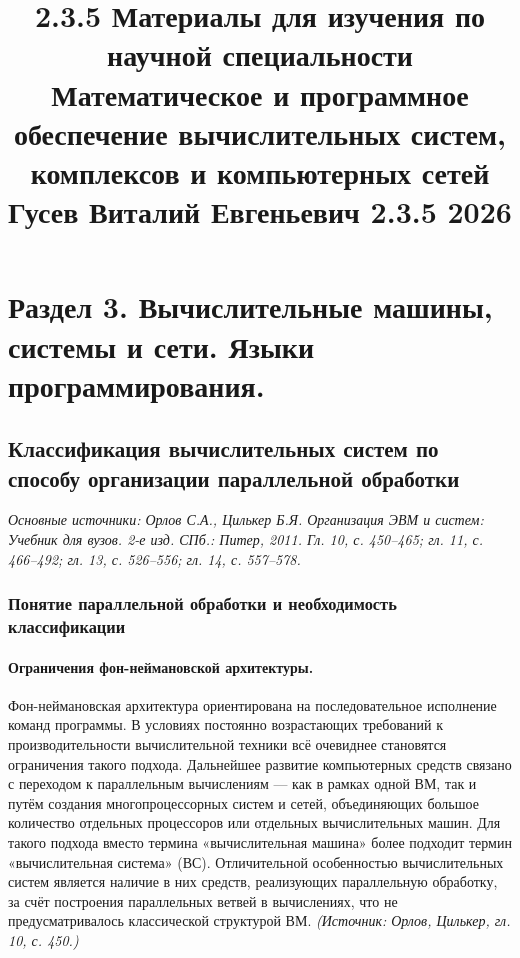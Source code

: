 \documentclass[a4paper,12pt]{article}
\title{2.3.5 Материалы для изучения по научной специальности \\
Математическое и программное обеспечение вычислительных систем, комплексов и компьютерных сетей \\
Гусев Виталий Евгеньевич 2.3.5 2026}
\date{}
\begin{document}
\maketitle

\tableofcontents
\newpage

\setcounter{section}{1} %
\section{Раздел 3. Вычислительные машины, системы и сети. Языки программирования.}

\subsection{Классификация вычислительных систем по способу организации параллельной обработки}

\noindent\textit{Основные источники: Орлов С.А., Цилькер Б.Я. Организация ЭВМ и систем: Учебник для вузов. 2-е изд. СПб.: Питер, 2011. Гл. 10, с. 450--465; гл. 11, с. 466--492; гл. 13, с. 526--556; гл. 14, с. 557--578.}

\subsubsection{Понятие параллельной обработки и необходимость классификации}

\paragraph{Ограничения фон-неймановской архитектуры.}
Фон-неймановская архитектура ориентирована на последовательное исполнение команд программы. В условиях постоянно возрастающих требований к производительности вычислительной техники всё очевиднее становятся ограничения такого подхода. Дальнейшее развитие компьютерных средств связано с переходом к параллельным вычислениям — как в рамках одной ВМ, так и путём создания многопроцессорных систем и сетей, объединяющих большое количество отдельных процессоров или отдельных вычислительных машин. Для такого подхода вместо термина «вычислительная машина» более подходит термин «вычислительная система» (ВС). Отличительной особенностью вычислительных систем является наличие в них средств, реализующих параллельную обработку, за счёт построения параллельных ветвей в вычислениях, что не предусматривалось классической структурой ВМ.
\textit{(Источник: Орлов, Цилькер, гл. 10, с. 450.)}
\end{document}
